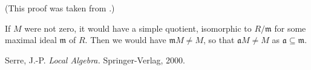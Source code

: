 \documentclass[12pt]{article}
\begin{document}
(This proof was taken from \cite{localalg}.)

If $M$ were not zero, it would have a simple quotient, isomorphic to $R/\mathfrak{m}$ for some maximal ideal $\mathfrak{m}$ of $R$.  Then we would have $\mathfrak{m}M\neq M$, so that $\mathfrak{a}M\neq M$ as $\mathfrak{a}\subseteq \mathfrak{m}$.

\begin{thebibliography}{9}
   Serre, J.-P. {\em Local Algebra.}  Springer-Verlag, 2000.
\end{thebibliography}
\end{document}
